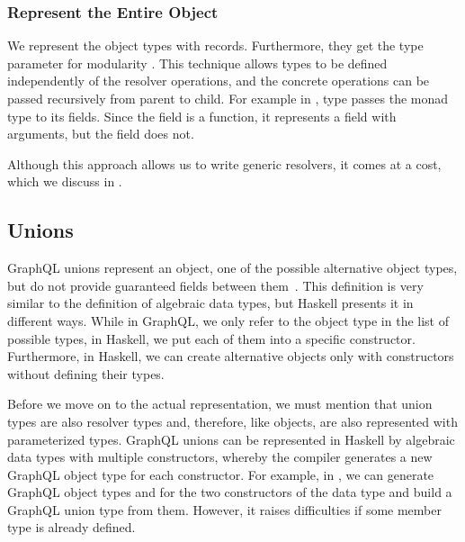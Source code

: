 \subsubsection{Represent the Entire Object}

We represent the object types with records. Furthermore, they get the type parameter  for modularity .
This technique allows types to be defined independently of the resolver operations, and the concrete operations can be passed recursively from parent to child. 
For example in , type  passes 
the monad type to its fields. Since the field  is a function, it represents a field with arguments, but the field  does not.


Although this approach allows us to write generic resolvers, it comes at a cost, which we discuss in .

\subsection{Unions}
\label{sec:mapping:union}

GraphQL unions represent an object, one of the possible alternative object types, but do not provide guaranteed fields between them~\cite {gql-spec}.
This definition is very similar to the definition of algebraic data types, but Haskell presents it in different ways. While in GraphQL, we only refer to the object type in the list of possible types, in Haskell, we put each of them into a specific constructor. Furthermore, in Haskell, we can create alternative objects only with constructors without defining their types.

Before we move on to the actual representation, we must mention that union types are also resolver types and, therefore, like objects, are also represented with parameterized types. 
GraphQL unions can be represented in Haskell by algebraic data types with multiple constructors, whereby the compiler generates a new GraphQL object type for each constructor. 
For example, in , we can generate GraphQL object types  and  for the two constructors of the data type  and build a GraphQL union type from them. However, it raises difficulties if some member type is already defined.


